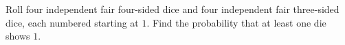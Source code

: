 Roll four independent fair four-sided dice and four independent fair three-sided dice, each numbered starting at $1$. Find the probability that at least one die shows $1$.
